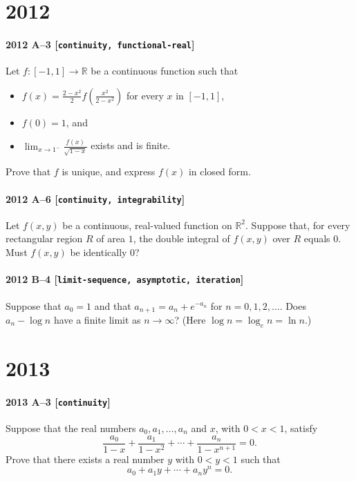 \documentclass[11pt]{article}
\begin{document}
\section*{2012}

\paragraph{2012 A--3 \textnormal{[\texttt{continuity, functional-real}]}}
Let $f: [-1, 1] \to \mathbb{R}$ be a continuous function such that
\begin{itemize}
\item[(i)]
$f(x) = \frac{2-x^2}{2} f \left( \frac{x^2}{2-x^2} \right)$ for every $x$ in $[-1, 1]$,
\item[(ii)]
$f(0) = 1$, and
\item[(iii)]
$\lim_{x \to 1^-} \frac{f(x)}{\sqrt{1-x}}$ exists and is finite.
\end{itemize}
Prove that $f$ is unique, and express $f(x)$ in closed form.

\paragraph{2012 A--6 \textnormal{[\texttt{continuity, integrability}]}}
Let $f(x,y)$ be a continuous, real-valued function on $\mathbb{R}^2$. Suppose that, for every
rectangular region $R$ of area $1$, the double integral of $f(x,y)$ over $R$ equals $0$.
Must $f(x,y)$ be identically 0?

\paragraph{2012 B--4 \textnormal{[\texttt{limit-sequence, asymptotic, iteration}]}}
Suppose that $a_0 = 1$ and that $a_{n+1} = a_n + e^{-a_n}$ for $n=0,1,2,\dots$. Does $a_n - \log n$
have a finite limit as $n \to \infty$? (Here $\log n = \log_e n = \ln n$.)

\section*{2013}

\paragraph{2013 A--3 \textnormal{[\texttt{continuity}]}}
Suppose that the real numbers $a_0, a_1, \dots, a_n$ and
$x$, with $0 < x < 1$, satisfy
\[
\frac{a_0}{1-x} + \frac{a_1}{1-x^2} + \cdots + \frac{a_n}{1 - x^{n+1}} = 0.
\]
Prove that there exists a real number $y$ with $0 < y < 1$ such that
\[
a_0 + a_1 y + \cdots + a_n y^n = 0.
\]
\end{document}
